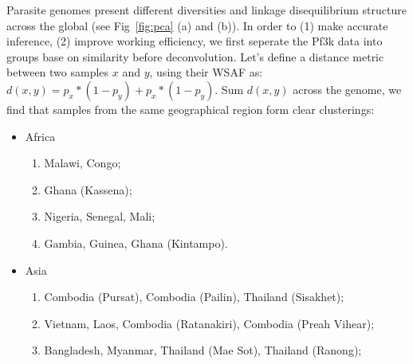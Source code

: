 \documentclass{article}
\begin{document}
Parasite genomes present different diversities and linkage disequilibrium structure across the global (see Fig~\ref{fig:pca} (a) and (b)). In order to (1) make accurate inference, (2) improve working efficiency, we first seperate the Pf3k data into groups base on similarity before deconvolution. Let's define a distance metric between two samples $x$ and $y$, using their WSAF as:
$d(x, y) = p_{x} * (1-p_{y}) + p_{x} * (1-p_{y})$. Sum $d(x, y)$ across the genome, we find that samples from the same geographical region form clear clusterings:
\linespread{1}
\begin{itemize}
\item Africa
\begin{enumerate}
\item Malawi, Congo;
\item Ghana (Kassena);
\item Nigeria, Senegal, Mali;
\item Gambia, Guinea, Ghana (Kintampo).
\end{enumerate}
\item Asia
\begin{enumerate}
\item Combodia (Pursat), Combodia (Pailin), Thailand (Sisakhet);
\item Vietnam, Laos, Combodia (Ratanakiri), Combodia (Preah Vihear);
\item Bangladesh, Myanmar, Thailand (Mae Sot), Thailand (Ranong);
\end{enumerate}
\end{itemize}
\linespread{1.5}
\end{document}

